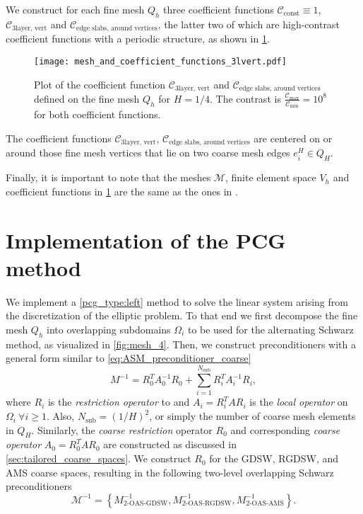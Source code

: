 We construct for each fine mesh $Q_h$ three coefficient functions $\mathcal{C}_{\text{const}}\equiv 1$, $\mathcal{C}_{\text{3layer, vert}}$ and $\mathcal{C}_{\text{edge slabs, around vertices}}$, the latter two of which are high-contrast coefficient functions with a periodic structure, as shown in \cref{fig:coefficient_functions}. 
\begin{figure}[H]
    \texttt{[image: mesh\_and\_coefficient\_functions\_3lvert.pdf]}
    \caption{Plot of the coefficient function $\mathcal{C}_{\text{3layer, vert}}$ and $\mathcal{C}_{\text{edge slabs, around vertices}}$ defined on the fine mesh $Q_h$ for $H=1/4$. The contrast is $\frac{\mathcal{C}_{\text{max}}}{\mathcal{C}_{\text{min}}} = 10^8$ for both coefficient functions.}
    \label{fig:coefficient_functions}
\end{figure}
The coefficient functions $\mathcal{C}_{\text{3layer, vert}}$, $\mathcal{C}_{\text{edge slabs, around vertices}}$ are centered on or around those fine mesh vertices that lie on two coarse mesh edges $e_i^H\in Q_H$.

Finally, it is important to note that the meshes $\mathcal{M}$, finite element space $V_h$ and coefficient functions in \cref{fig:coefficient_functions} are the same as the ones in \cite{ams_coarse_space_comp_study_Alves2024}.

\section{Implementation of the PCG method}\label{sec:implementation_pcg}
We implement a \ref{pcg_type:left} method to solve the linear system arising from the discretization of the elliptic problem. To that end we first decompose the fine mesh $Q_h$ into overlapping subdomains $\Omega_i$ to be used for the alternating Schwarz method, as visualized in \cref{fig:mesh_4}. Then, we construct preconditioners with a general form similar to \cref{eq:ASM_preconditioner_coarse}
\[
    M^{-1} = R_0^T A_0^{-1} R_0 + \sum_{i=1}^{N_{\text{sub}}} R_i^T A_i^{-1} R_i,
\]
where $R_i$ is the \textit{restriction operator} to and $A_i = R_i^T A R_i$ is the \textit{local operator} on $\Omega_i \ \forall i \geq 1$. Also, $N_{\text{sub}} = (1/H)^2$, or simply the number of coarse mesh elements in $Q_H$. Similarly, the \textit{coarse restriction} operator $R_0$ and corresponding \textit{coarse operator} $A_0 = R_0^T A R_0$ are constructed as discussed in \cref{sec:tailored_coarse_spaces}. We construct $R_0$ for the GDSW, RGDSW, and AMS coarse spaces, resulting in the following two-level overlapping Schwarz preconditioners
\begin{equation}
    \mathcal{M}^{-1} =  \left\{M^{-1}_{\text{2-OAS-GDSW}}, M^{-1}_{\text{2-OAS-RGDSW}}, M^{-1}_{\text{2-OAS-AMS}}\right\}.
    \label{eq:preconditioners}
\end{equation}